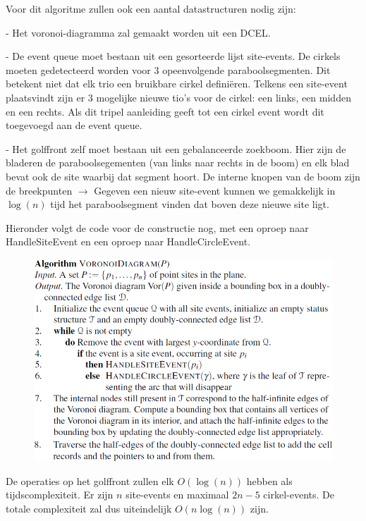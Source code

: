 \documentclass[12pt,a4paper]{article}
\begin{document}
	Voor dit algoritme zullen ook een aantal datastructuren nodig zijn: 
	\begin{description}
		\item - Het voronoi-diagramma zal gemaakt worden uit een DCEL. 
		\item - De event queue moet bestaan uit een gesorteerde lijst site-events. De cirkels moeten gedetecteerd worden voor 3 opeenvolgende paraboolsegmenten. Dit betekent niet dat elk trio een bruikbare cirkel definiëren. Telkens een site-event plaatsvindt zijn er 3 mogelijke nieuwe tio's voor de cirkel: een links, een midden en een rechts. Als dit tripel aanleiding geeft tot een cirkel event wordt dit toegevoegd aan de event queue. 
		\item - Het golffront zelf moet bestaan uit een gebalanceerde zoekboom. Hier zijn de bladeren de paraboolsegementen (van links naar rechts in de boom) en elk blad bevat ook de site waarbij dat segment hoort. De interne knopen van de boom zijn de breekpunten $\rightarrow$ Gegeven een nieuw site-event kunnen we gemakkelijk in $\log(n)$ tijd het paraboolsegment vinden dat boven deze nieuwe site ligt. 
	\end{description}
	Hieronder volgt de code voor de constructie nog, met een oproep naar HandleSiteEvent en een oproep naar HandleCircleEvent. 
	\begin{figure}[H]
		\centering
		\includegraphics[width=0.9\linewidth]{afbeeldingen/voronoi/voronoi-diagramma}
		\label{fig:voronoi-diagramma}
	\end{figure}

	De operaties op het golffront zullen elk $O(\log(n))$ hebben als tijdscomplexiteit. Er zijn $n$ site-events en maximaal $2n-5$ cirkel-events. De totale complexiteit zal dus uiteindelijk $O(n\log(n))$ zijn. 
	
\end{document}
